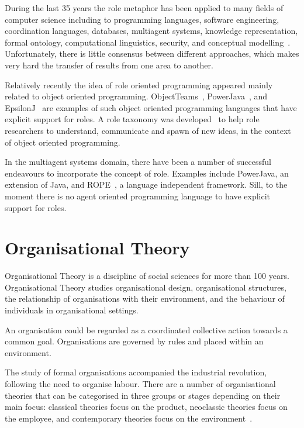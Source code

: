 \documentclass[a4paper,12pt,oneside,fleqn]{book} %
\begin{document}
During the last 35 years the role metaphor has been applied to many fields
of computer science including to programming languages, software
engineering, coordination languages, databases, multiagent systems,
knowledge representation, formal ontology, computational linguistics,
security, and conceptual modelling~\cite{DBLP:journals/ao/BoellaTV07}.
Unfortunately, there is little consensus between different approaches,
which makes very hard the transfer of results from one area to another.

Relatively recently the idea of role oriented programming appeared mainly
related to object oriented programming.
ObjectTeams~\cite{DBLP:journals/ao/Herrmann07},
PowerJava~\cite{DBLP:journals/entcs/BaldoniBT06}, and
EpsilonJ~\cite{DBLP:conf/snpd/MonpratarnchaiT08} are examples of such
object oriented programming languages that have explicit support for roles.
A role taxonomy was developed~\cite{graversen06nature} to help role
researchers to understand, communicate and spawn of new ideas, in the
context of object oriented programming.

In the multiagent systems domain, there have been a number of successful
endeavours to incorporate the concept of role. Examples include PowerJava,
an extension of Java, and ROPE~\cite{DBLP:conf/coopis/BechtGKM99}, a
language independent framework.  Sill, to the moment there is no agent
oriented programming language to have explicit support for roles.


\section{Organisational Theory}  %

Organisational Theory is a discipline of social sciences for more than 100
years. Organisational Theory studies organisational design, organisational
structures, the relationship of organisations with their environment, and
the behaviour of individuals in organisational settings.

An organisation could be regarded as a coordinated collective action
towards a common goal. Organisations are governed by rules and placed
within an environment.

The study of formal organisations accompanied the industrial
revolution, following the need to organise labour. There are a number of
organisational theories that can be categorised in three groups or stages
depending on their main focus: classical theories focus on the product,
neoclassic theories focus on the employee, and contemporary theories focus
on the environment~\cite{DohertySD01}.
\end{document}
